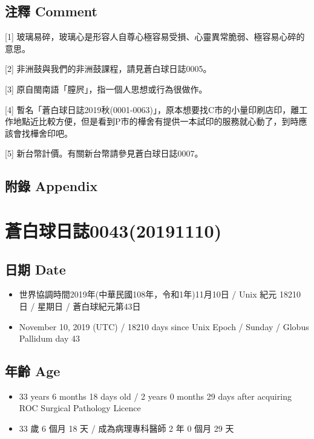\documentclass[a5paper, 12pt
]{book}
\providecommand{\tightlist}{%
  \setlength{\itemsep}{0pt}\setlength{\parskip}{0pt}}
\begin{document}
\hypertarget{ux6ce8ux91cb-comment-35}{%
\subsection{注釋 Comment}\label{ux6ce8ux91cb-comment-35}}

{[}1{]}
玻璃易碎，玻璃心是形容人自尊心極容易受損、心靈異常脆弱、極容易心碎的意思。

{[}2{]} 非洲鼓與我們的非洲鼓課程，請見蒼白球日誌0005。

{[}3{]} 原自閩南語「膣屄」，指一個人思想或行為很做作。

{[}4{]}
暫名「蒼白球日誌2019秋(0001-0063)」，原本想要找C市的小量印刷店印，離工作地點近比較方便，但是看到P市的樺舍有提供一本試印的服務就心動了，到時應該會找樺舍印吧。

{[}5{]} 新台幣計價。有關新台幣請參見蒼白球日誌0007。

\hypertarget{ux9644ux9304-appendix-34}{%
\subsection{附錄 Appendix}\label{ux9644ux9304-appendix-34}}

\hypertarget{ux84bcux767dux7403ux65e5ux8a8c004320191110}{%
\section{蒼白球日誌0043(20191110)}\label{ux84bcux767dux7403ux65e5ux8a8c004320191110}}

\hypertarget{ux65e5ux671f-date-42}{%
\subsection{日期 Date}\label{ux65e5ux671f-date-42}}

\begin{itemize}
\tightlist
\item
  世界協調時間2019年(中華民國108年，令和1年)11月10日 / Unix 紀元 18210
  日 / 星期日 / 蒼白球紀元第43日
\item
  November 10, 2019 (UTC) / 18210 days since Unix Epoch / Sunday /
  Globus Pallidum day 43
\end{itemize}

\hypertarget{ux5e74ux9f61-age-42}{%
\subsection{年齡 Age}\label{ux5e74ux9f61-age-42}}

\begin{itemize}
\tightlist
\item
  33 years 6 months 18 days old / 2 years 0 months 29 days after
  acquiring ROC Surgical Pathology Licence
\item
  33 歲 6 個月 18 天 / 成為病理專科醫師 2 年 0 個月 29 天
\end{itemize}
\end{document}
